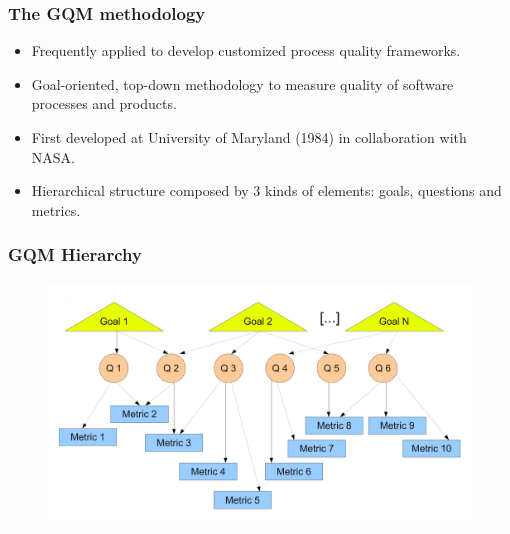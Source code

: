 \documentclass{beamer}
\begin{document}
\begin{frame}
 \frametitle{The GQM methodology}
 \begin{itemize}
  \item Frequently applied to develop customized process quality frameworks.
  \item Goal-oriented, top-down methodology to measure quality of software
processes and products.
  \item First developed at University of Maryland (1984) in collaboration with NASA.
  \item Hierarchical structure composed by 3 kinds of elements: goals, questions and
metrics.
  \end{itemize}

\end{frame}


\begin{frame}
 \frametitle{GQM Hierarchy}
\begin{center}
\begin{figure}
 \includegraphics[height=6.5cm]{figs/gqm-abstract-example.pdf}
\end{figure}
\end{center}
\end{frame}

\end{document}
